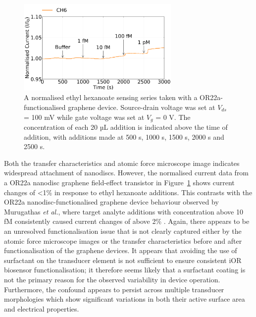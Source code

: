 \documentclass[
  a4paper,
]{scrbook}
\begin{document}
\begin{figure}

{\centering \includegraphics[width=0.7\textwidth,height=\textheight]{figures/ch8/Q3C3_filtered_detrend_trunc_arrows_normalised.png}

}

\caption{\label{fig-graphene-sensing}A normalised ethyl hexanoate
sensing series taken with a OR22a-functionalised graphene device.
Source-drain voltage was set at \(V_{ds}\) = 100 mV while gate voltage
was set at \(V_g\) = 0 V. The concentration of each 20 µL addition is
indicated above the time of addition, with additions made at 500 s, 1000
s, 1500 s, 2000 s and 2500 s.}

\end{figure}

Both the transfer characteristics and atomic force microscope image
indicates widespread attachment of nanodiscs. However, the normalised
current data from a OR22a nanodisc graphene field-effect transistor in
Figure~\ref{fig-graphene-sensing} shows current changes of \textless1\%
in response to ethyl hexanoate additions. This contrasts with the OR22a
nanodisc-functionalised graphene device behaviour observed by Murugathas
\emph{et al.}, where target analyte additions with concentration above
10 fM consistently caused current changes of above 2\%
\autocite{Murugathas2020}. Again, there appears to be an unresolved
functionalisation issue that is not clearly captured either by the
atomic force microscope images or the transfer characteristics before
and after functionalisation of the graphene devices. It appears that
avoiding the use of surfactant on the transducer element is not
sufficient to ensure consistent iOR biosensor functionalisation; it
therefore seems likely that a surfactant coating is not the primary
reason for the observed variability in device operation. Furthermore,
the confound appears to persist across multiple transducer morphologies
which show significant variations in both their active surface area and
electrical properties.
\end{document}
